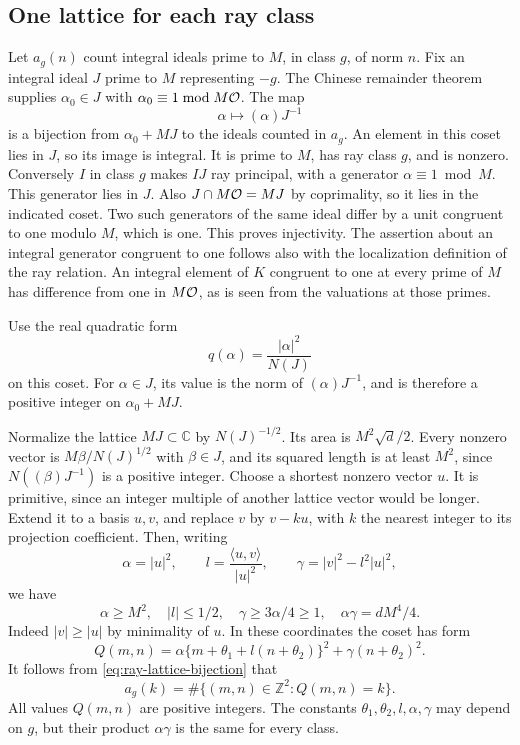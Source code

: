 \subsection{One lattice for each ray class}

Let \(a_g(n)\) count integral ideals prime to \(M\), in class \(g\),
of norm \(n\). Fix an integral ideal \(J\) prime to \(M\) representing
\(-g\). The Chinese remainder theorem supplies
\(\alpha_0\in J\) with \(\alpha_0\equiv1\bmod M{\cal O}\).
The map
\begin{equation}
 \label{eq:ray-lattice-bijection}
 \alpha\longmapsto(\alpha)J^{-1}
\end{equation}
is a bijection from \(\alpha_0+MJ\) to the ideals counted in
\(a_g\). An element in this coset lies in \(J\), so its image is
integral. It is prime to \(M\), has ray class \(g\), and is nonzero.
Conversely \(I\) in class \(g\) makes \(IJ\) ray principal, with
a generator \(\alpha\equiv1\bmod M\). This generator lies in \(J\).
Also
\(J\cap M{\cal O}=MJ\) by coprimality, so it lies in the indicated
coset. Two such generators of the same ideal differ by a unit
congruent to one modulo \(M\), which is one. This proves injectivity.
The assertion about an integral generator congruent to one follows
also with the localization definition of the ray relation. An integral
element of \(K\) congruent to one at every prime of \(M\) has difference
from one in \(M{\cal O}\), as is seen from the valuations at those primes.

Use the real quadratic form
\[
                         q(\alpha)=\frac{|\alpha|^2}{N(J)}
\]
on this coset. For \(\alpha\in J\), its value is the norm of
\((\alpha)J^{-1}\), and is therefore a positive integer on
\(\alpha_0+MJ\).

Normalize the lattice \(MJ\subset\mathbb C\) by \(N(J)^{-1/2}\).
Its area is \(M^2\sqrt d/2\).
Every nonzero vector is \(M\beta/N(J)^{1/2}\) with \(\beta\in J\),
and its squared length is at least \(M^2\), since
\(N((\beta)J^{-1})\) is a positive integer.
Choose a shortest nonzero vector \(u\). It is primitive, since an
integer multiple of another lattice vector would be longer.
Extend it to a basis \(u,v\), and replace \(v\) by \(v-ku\), with
\(k\) the nearest integer to its projection coefficient.
Then, writing
\[
 \alpha=|u|^2,\qquad
 l=\frac{\langle u,v\rangle}{|u|^2},\qquad
 \gamma=|v|^2-l^2|u|^2,
\]
we have
\[
 \alpha\geq M^2,\quad |l|\leq1/2,\quad
 \gamma\geq3\alpha/4\geq1,\quad
                   \alpha\gamma=dM^4/4 .
\]
Indeed \(|v|\geq|u|\) by minimality of \(u\).
In these coordinates the coset has form
\[
 Q(m,n)=\alpha\{m+\theta_1+l(n+\theta_2)\}^2
                           +\gamma(n+\theta_2)^2 .
\]
It follows from \eqref{eq:ray-lattice-bijection} that
\begin{equation}
 \label{eq:ray-fiber-count}
        a_g(k)=\#\{(m,n)\in\mathbb Z^2:Q(m,n)=k\}.
\end{equation}
All values \(Q(m,n)\) are positive integers. The constants
\(\theta_1,\theta_2,l,\alpha,\gamma\) may depend on \(g\), but
their product \(\alpha\gamma\) is the same for every class.

